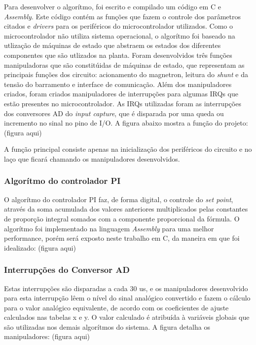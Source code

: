 Para desenvolver o algorítmo, foi escrito e compilado um código em C e \textit{Assembly}. Este código contém as funções que fazem o controle dos parâmetros citados e \textit{drivers} para os periféricos do microcontrolador utilizados. Como o microcontrolador não utiliza sistema operacional, o algorítmo foi baseado na utlização de máquinas de estado que abstraem os estados dos diferentes componentes que são utlizados na planta. Foram desenvolvidos três funções manipuladoras que são constitúidas de máquinas de estado, que representam as principais funções dos circuito: acionamento do magnetron, leitura do \textit{shunt} e da tensão do barramento e interface de comunicação. Além dos manipuladores criados, foram criados manipuladores de interrupções para algumas IRQs que estão presentes no microcontrolador. As IRQs utilizadas foram as interrupções dos conversores AD do \textit{input capture}, que é disparada por uma queda ou incremento no sinal no pino de I/O. A figura abaixo mostra a função  do projeto:
(figura aqui)

A função principal consiste apenas na inicialização dos periféricos do circuito
e no laço que ficará chamando os manipuladores desenvolvidos.

\subsubsection{Algorítmo do controlador PI}
O algorítmo do controlador PI faz, de forma digital, o controle do \textit{set point}, através da soma acumulada dos valores anteriores multiplicados pelas constantes de proporção integral somados com a componente proporcional da fórmula. O algorítmo foi implementado na linguagem \textit{Assembly} para uma melhor performance, porém será exposto neste trabalho em C, da maneira em que foi idealizado:
(figura aqui)

\subsubsection{Interrupções do Conversor AD}
Estas interrupções são disparadas a cada 30 us, e os manipuladores desenvolvido para esta interrupção lêem o nível do sinal analógico convertido e fazem o cálculo para o valor analógico equivalente, de acordo com os coeficientes de ajuste calculados nas tabelas x e y. O valor calculado é atribuída à variáveis globais que são utilizadas nos demais algorítmos do sistema. A figura detalha os manipuladores:
(figura aqui)


